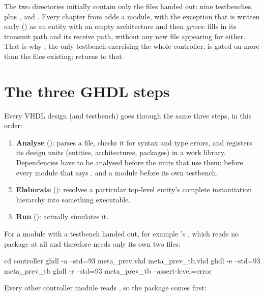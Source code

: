 The two directories initially contain only the files handed out: nine testbenches, plus
,  and . Every chapter from 
adds a module, with
the exception that  is written early () as an entity with an
empty architecture and then \emph{grows}:  fills in its transmit path and
 its receive path, without any new file appearing for either. That is why
, the only testbench exercising the whole controller, is gated on more than
the files existing;  returns to that.

\section{The three GHDL steps}
\label{app:sim:steps}

Every VHDL design (and testbench) goes through the same three steps, in this order:

\begin{enumerate}
  \item \textbf{Analyse} (): parses a  file, checks it for syntax and type
    errors, and registers its design units (entities, architectures, packages) in a work library.
    Dependencies have to be analysed before the units that use them:  before every
    module that says , and a module before its own testbench.
  \item \textbf{Elaborate} (): resolves a particular top-level entity's complete
    instantiation hierarchy into something executable.
  \item \textbf{Run} (): actually simulates it.
\end{enumerate}

For a module with a testbench handed out, for example 's , which
reads no package at all and therefore needs only its own two files:

\begin{shell}
cd controller
ghdl -a --std=93 meta_prev.vhd meta_prev_tb.vhd
ghdl -e --std=93 meta_prev_tb
ghdl -r --std=93 meta_prev_tb --assert-level=error
\end{shell}

Every other controller module reads , so the package comes first:

